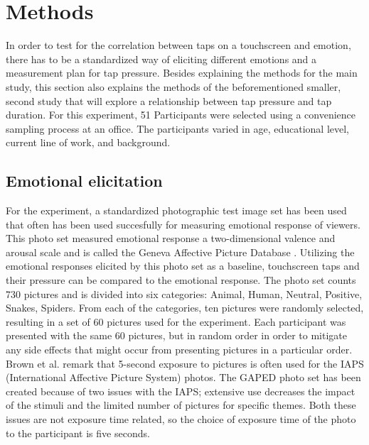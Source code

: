 \documentclass{sigchi}
\begin{document}


\section{Methods} %
\label{sec:methods}
In order to test for the correlation between taps on a touchscreen and emotion, there has to be a standardized way of eliciting different emotions and a measurement plan for tap pressure. Besides explaining the methods for the main study, this section also explains the methods of the beforementioned smaller, second study that will explore a relationship between tap pressure and tap duration. For this experiment, 51 Participants were selected using a convenience sampling process at an office. The participants varied in age, educational level, current line of work, and background. 

\subsection{Emotional elicitation} %
\label{sub:emotional_elicitation}
For the experiment, a standardized photographic test image set has been used that often has been used succesfully for measuring emotional response of viewers. This photo set measured emotional response a two-dimensional valence and arousal scale and is called the Geneva Affective Picture Database \cite{Dan-glauser2011}. Utilizing the emotional responses elicited by this photo set as a baseline, touchscreen taps and their pressure can be compared to the emotional response. The photo set counts 730 pictures and is divided into six categories: Animal, Human, Neutral, Positive, Snakes, Spiders. From each of the categories, ten pictures were randomly selected, resulting in a set of 60 pictures used for the experiment. Each participant was presented with the same 60 pictures, but in random order in order to mitigate any side effects that might occur from presenting pictures in a particular order. Brown et al. \cite{Neuroscience2012} remark that 5-second exposure to pictures is often used for the IAPS (International Affective Picture System) \cite{Lang1997} photos. The GAPED photo set has been created because of two issues with the IAPS; extensive use decreases the impact of the stimuli and the limited number of pictures for specific themes. Both these issues are not exposure time related, so the choice of exposure time of the photo to the participant is five seconds.
\end{document}
